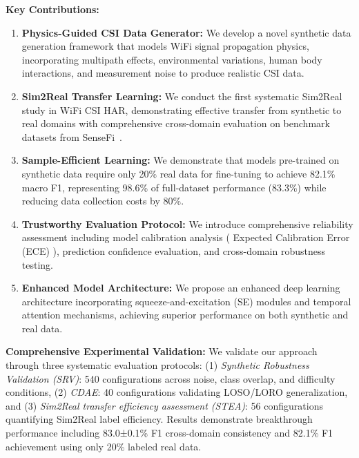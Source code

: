 \documentclass[journal]{IEEEtran}
\begin{document}
\textbf{Key Contributions:}
\begin{enumerate}
\item \textbf{Physics-Guided CSI Data Generator:} We develop a novel synthetic data generation framework that models WiFi signal propagation physics, incorporating multipath effects, environmental variations, human body interactions, and measurement noise to produce realistic CSI data.

\item \textbf{Sim2Real Transfer Learning:} We conduct the first systematic Sim2Real study in WiFi CSI HAR, demonstrating effective transfer from synthetic to real domains with comprehensive cross-domain evaluation on benchmark datasets from SenseFi~\cite{yang2023sensefi}.

\item \textbf{Sample-Efficient Learning:} We demonstrate that models pre-trained on synthetic data require only 20\% real data for fine-tuning to achieve 82.1\% macro F1, representing 98.6\% of full-dataset performance (83.3\%) while reducing data collection costs by 80\%.

\item \textbf{Trustworthy Evaluation Protocol:} We introduce comprehensive reliability assessment including model calibration analysis ( Expected Calibration Error (ECE) ), prediction confidence evaluation, and cross-domain robustness testing.

\item \textbf{Enhanced Model Architecture:} We propose an enhanced deep learning architecture incorporating squeeze-and-excitation (SE) modules and temporal attention mechanisms, achieving superior performance on both synthetic and real data.
\end{enumerate}

\textbf{Comprehensive Experimental Validation:} We validate our approach through three systematic evaluation protocols: (1) \textit{Synthetic Robustness Validation (SRV)}: 540 configurations across noise, class overlap, and difficulty conditions, (2) \textit{CDAE}: 40 configurations validating LOSO/LORO generalization, and (3) \textit{Sim2Real transfer efficiency assessment (STEA)}: 56 configurations quantifying Sim2Real label efficiency. Results demonstrate breakthrough performance including 83.0±0.1\% F1 cross-domain consistency and 82.1\% F1 achievement using only 20\% labeled real data.
\end{document}
